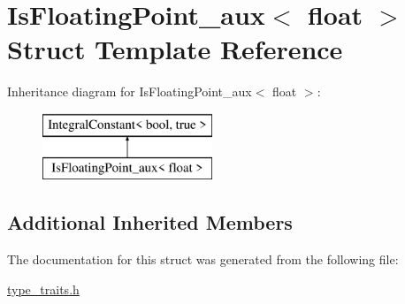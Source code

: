 \hypertarget{struct_is_floating_point__aux_3_01float_01_4}{}\section{Is\+Floating\+Point\+\_\+aux$<$ float $>$ Struct Template Reference}
\label{struct_is_floating_point__aux_3_01float_01_4}
Inheritance diagram for Is\+Floating\+Point\+\_\+aux$<$ float $>$\+:\begin{figure}[H]
\begin{center}
\leavevmode
\includegraphics[height=2.000000cm]{struct_is_floating_point__aux_3_01float_01_4}
\end{center}
\end{figure}
\subsection*{Additional Inherited Members}


The documentation for this struct was generated from the following file\+:\begin{DoxyCompactItemize}
\item 
\hyperlink{type__traits_8h}{type\+\_\+traits.\+h}\end{DoxyCompactItemize}
